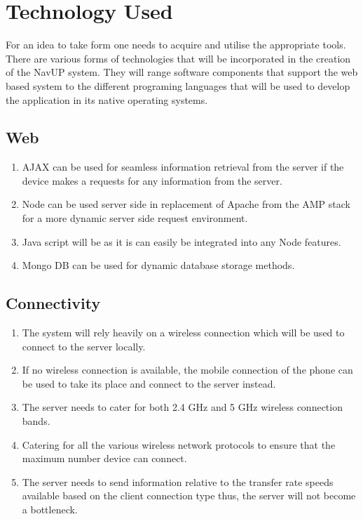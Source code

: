 \documentclass[11pt]{article}
\begin{document}
\section{Technology Used}
For an idea to take form one needs to acquire and utilise the appropriate tools. There are various forms of technologies that will be incorporated in the creation of the NavUP system. They will range software components that support the web based system to the different programing languages that will be used to develop the application in its native operating systems. 

\subsection{Web}

\begin{enumerate}

\item AJAX can be used for seamless information retrieval from the server if the device makes a requests for any information from the server.
\item Node can be used server side in replacement of Apache from the AMP stack for a more dynamic server side request environment.
\item Java script will be as it is can easily be integrated into any Node features.
\item Mongo DB can be used for dynamic database storage methods.

\end{enumerate}

\subsection{Connectivity}

\begin{enumerate}

\item The system will rely heavily on a wireless connection which will be used to connect to the server locally. 
\item If no wireless connection is available, the mobile connection of the phone can be used to take its place and connect to the server instead.
\item The server needs to cater for both 2.4 GHz and 5 GHz wireless connection bands.
\item Catering for all the various wireless network protocols to ensure that the maximum number device can connect. 
\item The server needs to send information relative to the transfer rate speeds available based on the client connection type thus, the server will not become a bottleneck. 

\end{enumerate}
\end{document}
